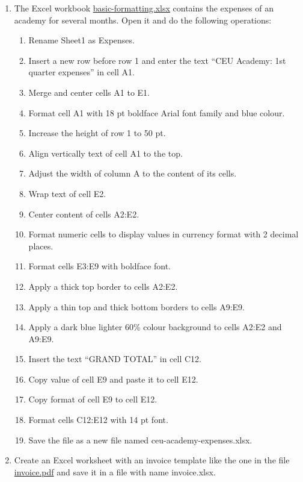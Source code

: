 \begin{enumerate}[leftmargin=*]
\item \label{ex-basic-formatting}The Excel workbook 
\href{http://aprendeconalf.es/office/excel/exercises/introduction/basic-formatting.xlsx}{\textsf{basic-formatting.xlsx}}
contains the expenses of an academy for several months.
Open it and do the following operations:
\begin{enumerate}
\item Rename \textsf{Sheet1} as \textsf{Expenses}.
\item Insert a new row before row 1 and enter the text ``CEU Academy: 1st quarter expenses'' in cell A1.
\item Merge and center cells A1 to E1.
\item Format cell A1 with 18 pt boldface Arial font family and blue colour.
\item Increase the height of row 1 to 50 pt.
\item Align vertically text of cell A1 to the top.
\item Adjust the width of column A to the content of its cells.
\item Wrap text of cell E2.
\item Center content of cells A2:E2.
\item Format numeric cells to display values in currency format with 2 decimal places.
\item Format cells E3:E9 with boldface font.
\item Apply a thick top border to cells A2:E2.
\item Apply a thin top and thick bottom borders to cells A9:E9.
\item Apply a dark blue lighter 60\% colour background to cells A2:E2 and A9:E9.
\item Insert the text ``GRAND TOTAL'' in cell C12.
\item Copy value of cell E9 and paste it to cell E12.
\item Copy format of cell E9 to cell E12. 
\item Format cells C12:E12 with 14 pt font.
\item Save the file as a new file named \textsf{ceu-academy-expenses.xlsx}.
\end{enumerate}

\item Create an Excel worksheet with an invoice template like the one in the file \href{http://aprendeconalf.es/office/excel/exercises/introduction/invoice.pdf}{\textsf{invoice.pdf}} and save it in a file with name \textsf{invoice.xlsx}.



\end{enumerate}
